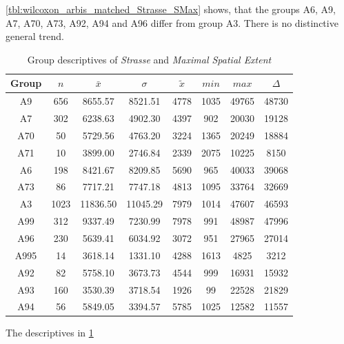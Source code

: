 \cref{tbl:wilcoxon_arbis_matched_Strasse_SMax} shows, that the groups A6, A9, A7, A70, A73, A92, A94 and A96 differ from group A3. There is no distinctive general trend.
\begin{table}[ht!]
	\tiny
	\centering
	\begin{tabular}{c|c|c|c|c|c|c|c}
		\toprule
		Group & $n$ & $\bar{x}$ & $\sigma$ & $\tilde{x}$ & $min$ & $max$ & $\Delta$ \\
		\midrule
		A9   & 656  & 8655.57  & 8521.51  & 4778 & 1035 & 49765 & 48730 \\ 
		A7   & 302  & 6238.63  & 4902.30  & 4397 & 902  & 20030 & 19128 \\ 
		A70  & 50   & 5729.56  & 4763.20  & 3224 & 1365 & 20249 & 18884 \\ 
		A71  & 10   & 3899.00  & 2746.84  & 2339 & 2075 & 10225 & 8150  \\ 
		A6   & 198  & 8421.67  & 8209.85  & 5690 & 965  & 40033 & 39068 \\ 
		A73  & 86   & 7717.21  & 7747.18  & 4813 & 1095 & 33764 & 32669 \\ 
		A3   & 1023 & 11836.50 & 11045.29 & 7979 & 1014 & 47607 & 46593 \\ 
		A99  & 312  & 9337.49  & 7230.99  & 7978 & 991  & 48987 & 47996 \\ 
		A96  & 230  & 5639.41  & 6034.92  & 3072 & 951  & 27965 & 27014 \\ 
		A995 & 14   & 3618.14  & 1331.10  & 4288 & 1613 & 4825  & 3212  \\ 
		A92  & 82   & 5758.10  & 3673.73  & 4544 & 999  & 16931 & 15932 \\ 
		A93  & 160  & 3530.39  & 3718.54  & 1926 & 99   & 22528 & 21829 \\ 
		A94  & 56   & 5849.05  & 3394.57  & 5785 & 1025 & 12582 & 11557 \\ 
		\bottomrule
	\end{tabular}
	\caption{Group descriptives of \textit{Strasse} and \textit{Maximal Spatial Extent}}
	\label{tbl:descriptives_arbis_matched_Strasse_SMax}
\end{table}
The descriptives in \cref{tbl:descriptives_arbis_matched_Strasse_SMax}

